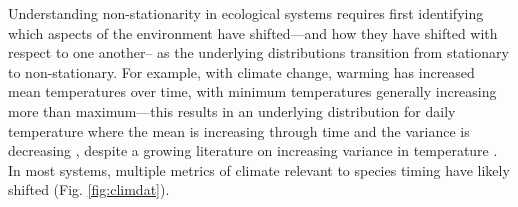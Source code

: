 \documentclass[11pt,letterpaper]{article}
\begin{document}
Understanding non-stationarity in ecological systems requires first identifying which aspects of the environment have shifted---and how they have shifted with respect to one another-- as the underlying distributions transition from stationary to non-stationary. For example, with climate change, warming has increased mean temperatures over time, with minimum temperatures generally increasing more than maximum---this results in an underlying distribution for daily temperature where the mean is increasing through time and the variance is decreasing \citep{ipcc2013,screen2014}, despite a growing literature on increasing variance in temperature \citep[e.g.,][]{vasseur2014}. In most systems, multiple metrics of climate relevant to species timing have likely shifted (Fig. \ref{fig:climdat}).

\end{document}
